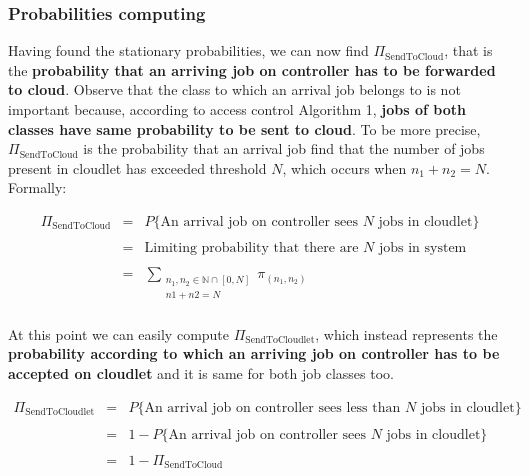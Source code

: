 \documentclass[10pt,a4paper]{article}
\begin{document}
\newpage
\subsubsection{Probabilities computing}

Having found the stationary probabilities, we can now find \textbf{$\Pi_{\text{SendToCloud}}$}, that is the \textbf{probability that an arriving job on controller has to be forwarded to cloud}. Observe that the class to which an arrival job belongs to is not important because, according to access control Algorithm 1, \textbf{jobs of both classes have same probability to be sent to cloud}. To be more precise, \textbf{$\Pi_{\text{SendToCloud}}$} is the probability that an arrival job find that the number of jobs present in cloudlet has exceeded threshold $N$, which occurs when $n_1 + n_2 = N$. Formally:

\begin{equation}
\begin{array} {lcl} 
\Pi_{\text{SendToCloud}} & = & P\lbrace{\text{An arrival job on controller sees $N$ jobs in cloudlet}}\rbrace \\\\

& = & \text{Limiting probability that there are $N$ jobs in system} \\\\

& = & \displaystyle \sum_{\substack{n_1, n_2 \in \mathbb{N} \cap [0, N] \\ n1+n2=N}} \pi_{(n_1,n_2)} \\
\end{array}
\end{equation}

At this point we can easily compute \textbf{$\Pi_{\text{SendToCloudlet}}$}, which instead represents the \textbf{probability according to which an arriving job on controller has to be accepted on cloudlet} and it is same for both job classes too.

\begin{equation}
\begin{array} {lcl} 
\Pi_{\text{SendToCloudlet}} & = & P\lbrace{\text{An arrival job on controller sees less than $N$ jobs in cloudlet}}\rbrace \\\\
& = & 1 - P\lbrace{\text{An arrival job on controller sees $N$ jobs in cloudlet}}\rbrace \\\\

& = & 1 - \Pi_{\text{SendToCloud}} \\\\
\end{array}
\end{equation}
\end{document}
